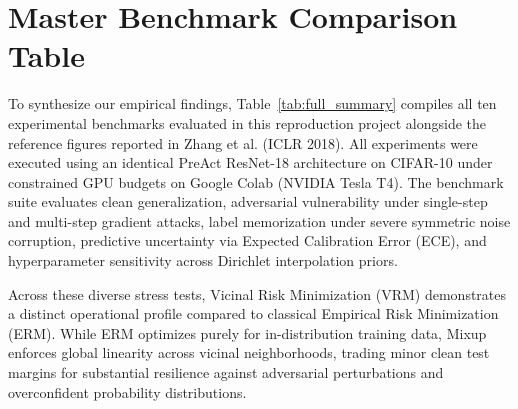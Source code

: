 \documentclass[conference]{IEEEtran}
\begin{document}
\clearpage
\section{Master Benchmark Comparison Table}

To synthesize our empirical findings, Table~\ref{tab:full_summary} compiles all ten experimental benchmarks evaluated in this reproduction project alongside the reference figures reported in Zhang et al. (ICLR 2018). All experiments were executed using an identical PreAct ResNet-18 architecture on CIFAR-10 under constrained GPU budgets on Google Colab (NVIDIA Tesla T4). The benchmark suite evaluates clean generalization, adversarial vulnerability under single-step and multi-step gradient attacks, label memorization under severe symmetric noise corruption, predictive uncertainty via Expected Calibration Error (ECE), and hyperparameter sensitivity across Dirichlet interpolation priors.

Across these diverse stress tests, Vicinal Risk Minimization (VRM) demonstrates a distinct operational profile compared to classical Empirical Risk Minimization (ERM). While ERM optimizes purely for in-distribution training data, Mixup enforces global linearity across vicinal neighborhoods, trading minor clean test margins for substantial resilience against adversarial perturbations and overconfident probability distributions.
\end{document}
